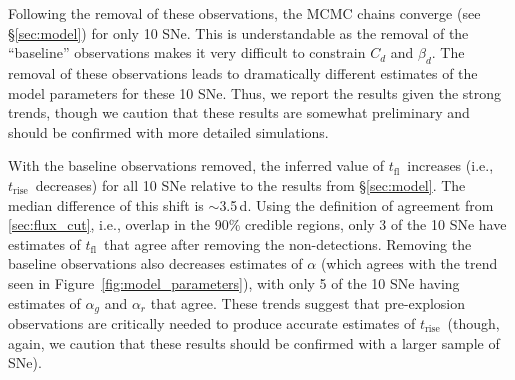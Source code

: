 \documentclass[twocolumn]{aastex63}
\newcommand{\tfl}{$t_\mathrm{fl}$}
\newcommand{\trise}{$t_\mathrm{rise}$}
\begin{document}
Following the removal of these observations, the MCMC chains converge (see
\S\ref{sec:model}) for only 10 SNe. This is understandable as the removal of
the ``baseline'' observations makes it very difficult to constrain $C_d$ and
$\beta_d$. The removal of these observations leads to dramatically different
estimates of the model parameters for these 10 SNe. Thus, we report the
results given the strong trends, though we caution that these results are
somewhat preliminary and should be confirmed with more detailed simulations.

With the baseline observations removed, the inferred value of \tfl\ increases
(i.e., \trise\ decreases) for all 10 SNe relative to the results from
\S\ref{sec:model}. The median difference of this shift is $\sim$3.5\,d. Using
the definition of agreement from \ref{sec:flux_cut}, i.e., overlap in the 90\%
credible regions, only 3 of the 10 SNe have estimates of \tfl\ that agree
after removing the non-detections. Removing the baseline observations also
decreases estimates of $\alpha$ (which agrees with the trend seen in
Figure~\ref{fig:model_parameters}), with only 5 of the 10 SNe having estimates
of $\alpha_g$ and $\alpha_r$ that agree. These trends suggest that
pre-explosion observations are critically needed to produce accurate estimates
of \trise\ (though, again, we caution that these results should be confirmed
with a larger sample of SNe).





\end{document}

